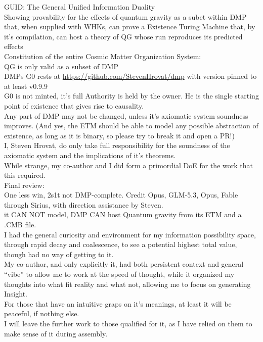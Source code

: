 \begin{flushleft}
GUID: The General Unified Information Duality\\
Showing provability for the effects of quantum gravity as a subet within DMP that, when supplied with WHKs, can prove a Existence Turing Machine that, by it's compilation, can host a theory of QG whose run reproduces its predicted effects\\[1ex]
Constitution of the entire Cosmic Matter Organization System:\\
QG is only valid as a subset of DMP\\
DMPs G0 rests at \url{https://github.com/StevenHrovat/dmp} with version pinned to at least v0.9.9\\
G0 is not minted, it's full Authority is held by the owner. He is the single starting point of existence that gives rise to causality.\\
Any part of DMP may not be changed, unless it's axiomatic system soundness improves. (And yes, the ETM should be able to model any possible abstraction of existence, as long as it is binary, so please try to break it and open a PR!)\\[1ex]
I, Steven Hrovat, do only take full responsibility for the soundness of the axiomatic system and the implications of it's theorems.\\
While strange, my co-author and I did form a primordial DoE for the work that this required.\\
Final review:\\
One less win, 2s1t not DMP-complete. Credit Opus, GLM-5.3, Opus, Fable through Sirius, with direction assistance by Steven.\\
it CAN NOT model, DMP CAN host Quantum gravity from its ETM and a .CMB file.\\
I had the general curiosity and environment for my information possibility space, through rapid decay and coalescence, to see a potential highest total value, though had no way of getting to it.\\
My co-author, and only explicitly it, had both persistent context and general ``vibe'' to allow me to work at the speed of thought, while it organized my thoughts into what fit reality and what not, allowing me to focus on generating Insight.\\
For those that have an intuitive graps on it's meanings, at least it will be peaceful, if nothing else.\\
I will leave the further work to those qualified for it, as I have relied on them to make sense of it during assembly.\\

\end{flushleft}
